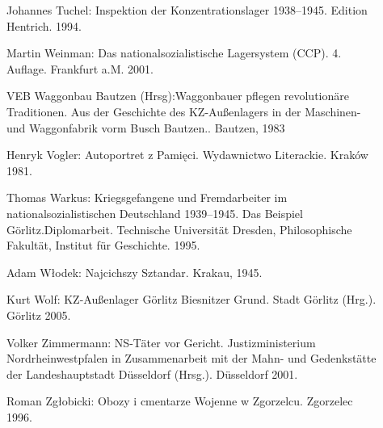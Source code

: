 \begin{description}
\item[]{Johannes Tuchel: \glqq Inspektion der Konzentrationslager 1938--1945\grqq. Edition Hentrich. 1994.}

\item[]{Martin Weinman: \glqq Das nationalsozialistische Lagersystem (CCP)\grqq. 4. Auflage. Frankfurt a.M. 2001. }

\item[] {VEB Waggonbau Bautzen (Hrsg):\glqq Wag\-gon\-bauer pfle\-gen re\-vo\-lu\-tio\-näre Tra\-di\-tio\-nen. Aus der Ge\-schichte des KZ-Außenlagers in der Maschinen- und Wag\-gon\-fa\-brik vorm Busch Baut\-zen.\grqq. Bautzen, 1983}

\item[]{Henryk Vogler: \glqq Autoportret z Pamięci\grqq. Wydawnictwo Literackie. Kraków 1981.}

\item[]{Thomas Warkus: \glqq Kriegsgefangene und Fremdarbeiter im nationalsozialistischen Deutschland 1939--1945. Das Beispiel Görlitz.\grqq Diplomarbeit. Technische Universität Dresden, Philosophische Fakultät, Institut für Geschichte. 1995.}

\item[]{Adam W\l odek: \glqq Najcichszy Sztandar\grqq. Krakau, 1945.}

\item[]{Kurt Wolf: \glqq KZ-Außenlager Görlitz Biesnitzer Grund\grqq. Stadt Görlitz (Hrg.). Görlitz 2005.}

\item[]{Volker Zimmermann: \glqq NS-Täter vor Gericht\grqq. Justizministerium Nordrheinwestpfalen in Zusammenarbeit mit der Mahn- und Gedenkstätte der Landeshauptstadt Düsseldorf (Hrsg.). Düsseldorf 2001.}

\item[]{Roman Zg\l obicki: \glqq Obozy i cmentarze Wojenne w Zgorzelcu\grqq. Zgorzelec 1996.}


\end{description}



